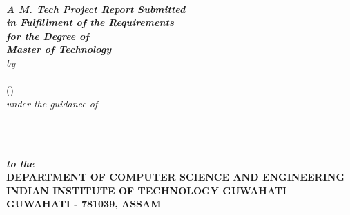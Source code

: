 \begin{titlepage}
\begin{center}
\textheight 15.5in \textwidth 12.5in {\large\sf  \textbf{\the\btptitle}}\\[12ex]
{\small{\textsl{ \textbf{A M. Tech Project Report Submitted \\
in Fulfillment of the Requirements \\
for the Degree of
\\[2ex]\small \bf Master of Technology}}}}\\[16ex] \emph{by} \\[2ex]
{\sf \sf \textbf{\the\name}\\
             (\the\rollno)}\\[1ex]
\emph{under the guidance of}\\[2ex]
{\sf \bf \the\guide} \\[7ex]

\vspace{1.2in}

 \begin{figure}[!h]
 \hfill
  \hfill \
 \end{figure}

{\sl \bf{to the}} \\[1ex]

{\small\bf DEPARTMENT OF COMPUTER SCIENCE AND ENGINEERING}  \\[1ex]
{\small \bf{INDIAN INSTITUTE OF TECHNOLOGY GUWAHATI \\GUWAHATI - 781039, ASSAM}}
%
\end{center}
\end{titlepage}
